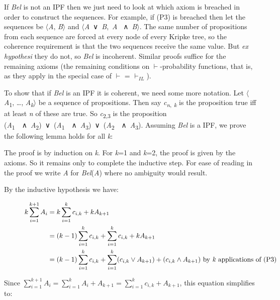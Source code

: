 \documentclass[
  11pt,
  letterpaper,
  DIV=11,
  numbers=noendperiod,
  twoside]{scrartcl}
\begin{document}
If \emph{Bel} is not an IPF then we just need to look at which axiom is
breached in order to construct the sequences. For example, if (P3) is
breached then let the sequences be \(\langle\)\emph{A},
\emph{B}\(\rangle\) and \(\langle\)\emph{A}~∨~\emph{B},~\emph{A}
~∧~\emph{B}\(\rangle\). The same number of propositions from each
sequence are forced at every node of every Kripke tree, so the coherence
requirement is that the two sequences receive the same value. But
\emph{ex hypothesi} they do not, so \emph{Bel} is incoherent. Similar
proofs suffice for the remaining axioms (the remaining conditions on
\(\vdash\)-probability functions, that is, as they apply in the special
case of \(\vdash\) = \(\vdash_{IL}\)).

To show that if \emph{Bel} is an IPF it is coherent, we need some more
notation. Let \(\langle\)\emph{A}\textsubscript{1}, \ldots,
\emph{A}\textsubscript{\emph{k}}\(\rangle\) be a sequence of
propositions. Then say \emph{c\textsubscript{n}}\textsubscript{,}
\textsubscript{\emph{k}} is the proposition true iff at least \emph{n}
of these are true. So \emph{c}\textsubscript{2,3} is the proposition
(\emph{A}\textsubscript{1}~~∧~\emph{A}\textsubscript{2})~∨~(\emph{A}\textsubscript{1}~~∧~\emph{A}\textsubscript{3})~∨~(\emph{A}\textsubscript{2}~~∧~\emph{A}\textsubscript{3}).
Assuming \emph{Bel} is a IPF, we prove the following lemma holds for all
\emph{k}:

The proof is by induction on \emph{k}. For \emph{k}=1 and \emph{k}=2,
the proof is given by the axioms. So it remains only to complete the
inductive step. For ease of reading in the proof we write \emph{A} for
\emph{Bel}(\emph{A}) where no ambiguity would result.

By the inductive hypothesis we have:

\begin{figure}

\begin{align*}
k\sum^{k+1}_{i=1}A_{i} &= k \sum^k_{i=1}c_{i,k} + kA_{k+1} \\
 &= (k-1)\sum_{i=1}^kc_{i,k} + \sum^k_{i=1}c_{i,k} + kA_{k+1} \\
 &= (k-1)\sum_{i=1}^{k}c_{i,k} + \sum^{k}_{i=1}(c_{i,k} \vee A_{k+1}) + (c_{i,k} \wedge A_{k+1}) \text{ by \textit{k} applications of (P3)}
\end{align*}

\end{figure}%

Since
\(\sum_{i=1}^{k+1}A_i = \sum_{i=1}^{k}A_i + A_{k+1} = \sum_{i=1}^{k}c_{i,k} + A_{k+1}\),
this equation simplifies to:
\end{document}
